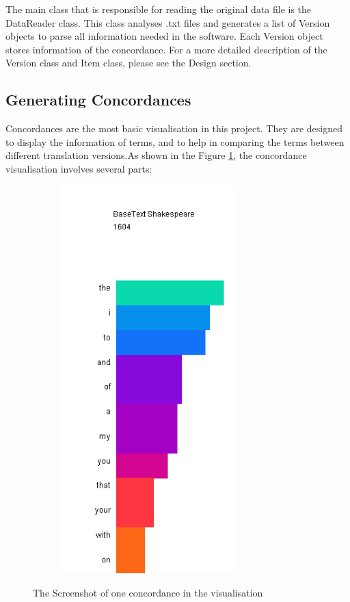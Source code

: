 The main class that is responsible for reading the original data file is the DataReader class. This class analyses .txt files and generates a list of Version objects to parse all information needed in the software. Each Version object stores information of the concordance. For a more detailed description of the Version class and Item class, please see the Design section.

\subsection{Generating Concordances}

Concordances are the most basic visualisation in this project. They are designed to display the information of terms, and to help in comparing the terms between different translation versions.As shown in the Figure \ref{fig:condorVis}, the concordance visualisation involves several parts:
\begin{figure}[H]
	\centering	
	\includegraphics[width=9cm, height=15cm]{Figs/condordanceVis}\\[1ex]
	\caption{The Screenshot of one concordance in the visualisation}
	\label{fig:condorVis}
\end{figure} 

